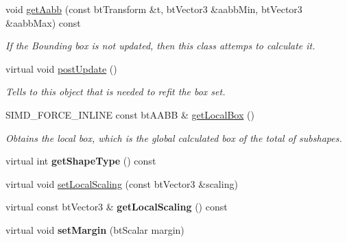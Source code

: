 \begin{DoxyCompactItemize}
void \hyperlink{classbtGImpactShapeInterface_a03644dc230664957e43ed49b4a319d64}{get\+Aabb} (const bt\+Transform \&t, bt\+Vector3 \&aabb\+Min, bt\+Vector3 \&aabb\+Max) const
\begin{DoxyCompactList}\small\item\em If the Bounding box is not updated, then this class attemps to calculate it. \end{DoxyCompactList}\item 
\mbox{\label{classbtGImpactShapeInterface_ac430754948ac92d6f70b81e88416c96a}} 
virtual void \hyperlink{classbtGImpactShapeInterface_ac430754948ac92d6f70b81e88416c96a}{post\+Update} ()
\begin{DoxyCompactList}\small\item\em Tells to this object that is needed to refit the box set. \end{DoxyCompactList}\item 
\mbox{\label{classbtGImpactShapeInterface_ad4f12ac5c91bf67349109aecdec65455}} 
S\+I\+M\+D\+\_\+\+F\+O\+R\+C\+E\+\_\+\+I\+N\+L\+I\+NE const bt\+A\+A\+BB \& \hyperlink{classbtGImpactShapeInterface_ad4f12ac5c91bf67349109aecdec65455}{get\+Local\+Box} ()
\begin{DoxyCompactList}\small\item\em Obtains the local box, which is the global calculated box of the total of subshapes. \end{DoxyCompactList}\item 
\mbox{\label{classbtGImpactShapeInterface_ac17994be6ed4358890b017d67c335df0}} 
virtual int {\bfseries get\+Shape\+Type} () const
\item 
virtual void \hyperlink{classbtGImpactShapeInterface_adec0bd43cd0105b1d0dc172bc7db50d8}{set\+Local\+Scaling} (const bt\+Vector3 \&scaling)
\item 
\mbox{\label{classbtGImpactShapeInterface_a702ea8c697ccf8c454e0b488dd0bf3f2}} 
virtual const bt\+Vector3 \& {\bfseries get\+Local\+Scaling} () const
\item 
\mbox{\label{classbtGImpactShapeInterface_a2732455f7b2cdb44c41481d9d9ebd548}} 
virtual void {\bfseries set\+Margin} (bt\+Scalar margin)
\item 

\end{DoxyCompactItemize}
